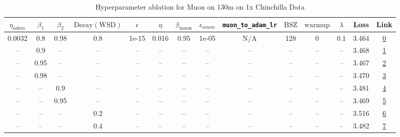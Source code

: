 \begin{table}[H]
\centering
\caption{Hyperparameter ablation for Muon on 130m on 1x Chinchilla Data}
\label{tab:ablation_muon_130m_1}
\begin{tabular}{cccccccccccccc}
\toprule
$\eta_{adam}$ & $\beta_1$ & $\beta_2$ & $\mathrm{Decay (WSD)}$ & $\epsilon$ & $\eta$ & $\mathrm{\beta_{muon}}$ & $\epsilon_{muon}$ & \texttt{muon\_to\_adam\_lr} & $\mathrm{BSZ}$ & $\mathrm{warmup}$ & $\lambda$ & Loss & Link \\
\midrule
0.0032 & 0.8 & 0.98 & 0.8 & 1e-15 & 0.016 & 0.95 & 1e-05 & N/A & 128 & 0 & 0.1 & 3.464 & \href{https://wandb.ai/stanford-mercury/optimizer-scaling/runs/sweep-130m-2B-muon02b4fclr0.016-wd0.1-minlr0-warmup0-b10.8-b20.9-9c2fe9}{0} \\
\midrule
-- & 0.9 & -- & -- & -- & -- & -- & -- & -- & -- & -- & -- & 3.468 & \href{https://wandb.ai/stanford-mercury/optimizer-scaling/runs/sweep-130m-2B-muon9087d6lr0.016-wd0.1-minlr0-warmup0-b10.9-b20.9-7b1a75}{1} \\
-- & 0.95 & -- & -- & -- & -- & -- & -- & -- & -- & -- & -- & 3.467 & \href{https://wandb.ai/stanford-mercury/optimizer-scaling/runs/sweep-130m-2B-muon4082ddlr0.016-wd0.1-minlr0-warmup0-b10.95-b20.-af0f73}{2} \\
-- & 0.98 & -- & -- & -- & -- & -- & -- & -- & -- & -- & -- & 3.470 & \href{https://wandb.ai/stanford-mercury/optimizer-scaling/runs/sweep-130m-2B-muonb222a7lr0.016-wd0.1-minlr0-warmup0-b10.98-b20.-7cb250}{3} \\
-- & -- & 0.9 & -- & -- & -- & -- & -- & -- & -- & -- & -- & 3.481 & \href{https://wandb.ai/stanford-mercury/optimizer-scaling/runs/sweep-130m-2B-muond0f9b1lr0.016-wd0.1-minlr0-warmup0-b10.8-b20.9-38cfa8}{4} \\
-- & -- & 0.95 & -- & -- & -- & -- & -- & -- & -- & -- & -- & 3.469 & \href{https://wandb.ai/stanford-mercury/optimizer-scaling/runs/sweep-130m-2B-muonac6a7elr0.016-wd0.1-minlr0-warmup0-b10.8-b20.9-6e2488}{5} \\
-- & -- & -- & 0.2 & -- & -- & -- & -- & -- & -- & -- & -- & 3.516 & \href{https://wandb.ai/stanford-mercury/optimizer-scaling/runs/sweep-130m-2B-muonc9c69flr0.016-wd0.1-minlr0-warmup0-b10.8-b20.9-26363a}{6} \\
-- & -- & -- & 0.4 & -- & -- & -- & -- & -- & -- & -- & -- & 3.482 & \href{https://wandb.ai/stanford-mercury/optimizer-scaling/runs/sweep-130m-2B-muon4327fdlr0.016-wd0.1-minlr0-warmup0-b10.8-b20.9-fdb346}{7} \\

\end{tabular}
\end{table}
